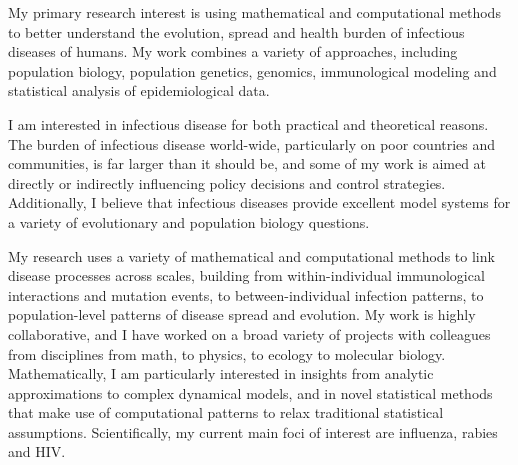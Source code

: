 \documentclass[12pt,a4paper]{article}
\begin{document}
\newcommand{\one}[1]{\vspace{\baselineskip}\hspace{-\parindent}{\large \bf #1}}
\newcommand{\two}[1]{\vspace{\baselineskip}\hspace{-\parindent}{\it #1}}
\newcommand{\square}{\vspace{1.5ex}\noindent}

\thispagestyle{empty}

\one{Research Statement -- Jonathan Dushoff}

\square My primary research interest is using mathematical and computational methods to better understand the evolution, spread and health burden of infectious diseases of humans.  My work combines a variety of approaches, including population biology, population genetics, genomics, immunological modeling and statistical analysis of epidemiological data.

I am interested in infectious disease for both practical and theoretical reasons.  The burden of infectious disease world-wide, particularly on poor countries and communities, is far larger than it should be, and some of my work is aimed at directly or indirectly influencing policy decisions and control strategies.  Additionally, I believe that infectious diseases provide excellent model systems for a variety of evolutionary and population biology questions.

My research uses a variety of mathematical and computational methods to link disease processes across scales, building from within-individual immunological interactions and mutation events, to between-individual infection patterns, to population-level patterns of disease spread and evolution.  My work is highly collaborative, and I have worked on a broad variety of projects with colleagues from disciplines from math, to physics, to ecology to molecular biology.  Mathematically, I am particularly interested in insights from analytic approximations to complex dynamical models, and in novel statistical methods that make use of computational patterns to relax traditional statistical assumptions. Scientifically, my current main foci of interest are influenza, rabies and HIV.
\end{document}
